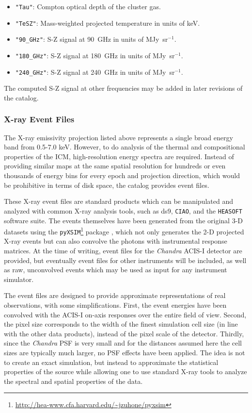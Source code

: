 \documentclass{emulateapj}
\newcommand{\code}[1]{\texttt{#1}}
\begin{document}
\begin{itemize}
\item \code{"Tau"}: Compton optical depth of the cluster gas.
\item \code{"TeSZ"}: Mass-weighted projected temperature in units of keV.
\item \code{"90\_GHz"}: S-Z signal at 90~GHz in units of MJy~sr$^{-1}$.
\item \code{"180\_GHz"}: S-Z signal at 180~GHz in units of MJy~sr$^{-1}$.
\item \code{"240\_GHz"}: S-Z signal at 240~GHz in units of MJy~sr$^{-1}$.
\end{itemize}

The computed S-Z signal at other frequencies may be added in later revisions of the catalog.

\subsubsection{X-ray Event Files}\label{sec:xray}

The X-ray emissivity projection listed above represents a single broad energy band from 0.5-7.0 keV. However, to do analysis of the thermal and compositional properties of the ICM, high-resolution energy spectra are required. Instead of providing similar maps at the same spatial resolution for hundreds or even thousands of energy bins for every epoch and projection direction, which would be prohibitive in terms of disk space, the catalog provides event files.

These X-ray event files are standard products which can be manipulated and analyzed with common X-ray analysis tools, such as ds9, \code{CIAO}, and the \code{HEASOFT} software suite. The events themselves have been generated from the original 3-D datasets using the \code{pyXSIM}\footnote{\url{http://hea-www.cfa.harvard.edu/~jzuhone/pyxsim}} package \citep{zuh14}, which not only generates the 2-D projected X-ray events but can also convolve the photons with instrumental response matrices. At the time of writing, event files for the {\it Chandra} ACIS-I detector are provided, but eventually event files for other instruments will be included, as well as raw, unconvolved events which may be used as input for any instrument simulator.

The event files are designed to provide approximate representations of real observations, with some simplifications. First, the event energies have been convolved with the ACIS-I on-axis responses over the entire field of view. Second, the pixel size corresponds to the width of the finest simulation cell size (in line with the other data products), instead of the pixel scale of the detector. Thirdly, since the {\it Chandra} PSF is very small and for the distances assumed here the cell sizes are typically much larger, no PSF effects have been applied. The idea is not to create an exact simulation, but instead to approximate the statistical properties of the source while allowing one to use standard X-ray tools to analyze the spectral and spatial properties of the data.
\end{document}

